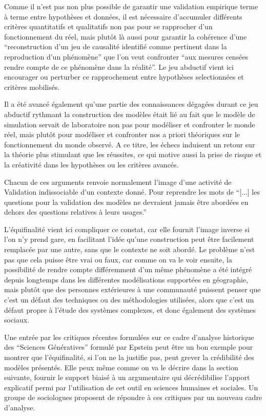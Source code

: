 Comme il n'est pas non plus possible de garantir une validation empirique terme à terme entre hypothèses et données, il est nécessaire d'accumuler différents critères quantitatifs et qualitatifs non pas pour se rapprocher d'un fonctionnement du réel, mais plutôt là aussi pour garantir la cohérence d'une \enquote{reconstruction d'un jeu de causalité identifié comme pertinent dans la reproduction d'un phénomène} que l'on veut confronter \enquote{aux mesures censées rendre compte de ce phénomène dans la réalité}. Le jeu abductif vient ici encourager ou perturber ce rapprochement entre hypothèses selectionnées et critères mobilisés.

Il a été avancé également qu'une partie des connaissances dégagées durant ce jeu abductif rythmant la construction des modèles était lié au fait que le modèle de simulation servait de laboratoire non pas pour modéliser et confronter le monde réel, mais plutôt pour modéliser et confronter nos a priori théoriques sur le fonctionnement du monde observé. A ce titre, les échecs induisent un retour sur la théorie plus stimulant que les réussites, ce qui motive aussi la prise de risque et la créativité dans les hypothèses ou les critères avancés.

Chacun de ces arguments renvoie normalement l'image d'une activité de Validation indissociable d'un contexte donné. Pour reprendre les mots de \textcite{Amblard2006} \enquote{[...] les questions pour la validation des modèles ne devraient jamais être abordées en dehors des questions relatives à leurs usages.}

L'équifinalité vient ici compliquer ce constat, car elle fournit l'image inverse si l'on n'y prend gare, en facilitant l'idée qu'une construction peut être facilement remplacée par une autre, sans que le contexte ne soit abordé. Le problème n'est pas que cela puisse être vrai ou faux, car comme on va le voir ensuite, la possibilité de rendre compte différemment d'un même phénomène a été intégré depuis longtemps dans les différentes modélisations supportées en géographie, mais plutôt que des personnes extérieures à une communauté puissent penser que c'est un défaut des techniques ou des méthodologies utilisées, alors que c'est un défaut propre à l'étude des systèmes complexes, et donc également des systèmes sociaux.

Une entrée par les critiques récentes formulées sur ce cadre d'analyse historique des \enquote{Sciences Génératives} formulé par Epstein peut être un bon exemple pour montrer que l'équifinalité, si l'on ne la justifie pas, peut grever la crédibilité des modèles présentés. Elle peux même comme on va le décrire dans la section suivante, fournir le support biaisé à un argumentaire qui décrédibilise l'apport explicatif permi par l'utilisation de cet outil en sciences humaines et sociales. Un groupe de sociologues proposent de répondre à ces critiques par un nouveau cadre d'analyse.

